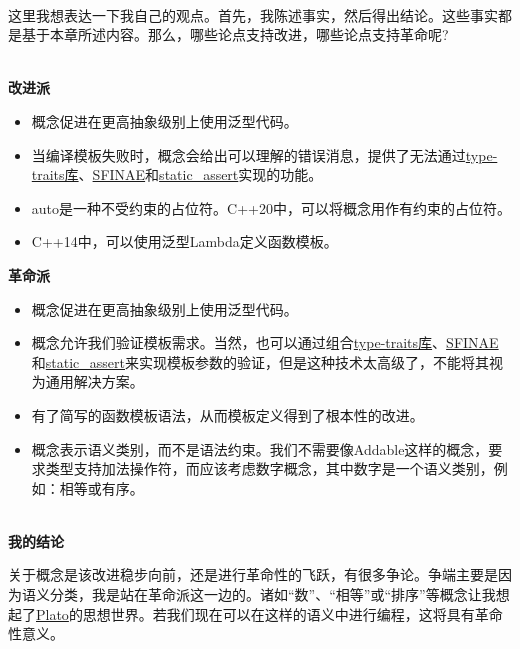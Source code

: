 \hspace*{\fill} \\ %
\begin{tcolorbox}[breakable,enhanced jigsaw,colback=blue!5!white,colframe=blue!75!black,title={常规类型}]

这里我想表达一下我自己的观点。首先，我陈述事实，然后得出结论。这些事实都是基于本章所述内容。那么，哪些论点支持改进，哪些论点支持革命呢?

\hspace*{\fill} \\ %
\noindent
\textbf{改进派}

\begin{itemize}
\item
概念促进在更高抽象级别上使用泛型代码。

\item
当编译模板失败时，概念会给出可以理解的错误消息，提供了无法通过\href{https://en.cppreference.com/w/cpp/header/type_traits}{type-traits库}、\href{https://en.cppreference.com/w/cpp/language/sfinae}{SFINAE}和\href{https://en.cppreference.com/w/cpp/language/static_assert}{static\_assert}实现的功能。

\item
auto是一种不受约束的占位符。C++20中，可以将概念用作有约束的占位符。

\item
C++14中，可以使用泛型Lambda定义函数模板。
\end{itemize}

\noindent
\textbf{革命派}

\begin{itemize}
\item
概念促进在更高抽象级别上使用泛型代码。

\item
概念允许我们验证模板需求。当然，也可以通过组合\href{https://en.cppreference.com/w/cpp/header/type_traits}{type-traits库}、\href{https://en.cppreference.com/w/cpp/language/sfinae}{SFINAE}和\href{https://en.cppreference.com/w/cpp/language/static_assert}{static\_assert}来实现模板参数的验证，但是这种技术太高级了，不能将其视为通用解决方案。

\item
有了简写的函数模板语法，从而模板定义得到了根本性的改进。

\item
概念表示语义类别，而不是语法约束。我们不需要像Addable这样的概念，要求类型支持加法操作符，而应该考虑数字概念，其中数字是一个语义类别，例如：相等或有序。
\end{itemize}

\hspace*{\fill} \\ %
\noindent
\textbf{我的结论}

关于概念是该改进稳步向前，还是进行革命性的飞跃，有很多争论。争端主要是因为语义分类，我是站在革命派这一边的。诸如“数”、“相等”或“排序”等概念让我想起了\href{https://en.wikipedia.org/wiki/Plato}{Plato}的思想世界。若我们现在可以在这样的语义中进行编程，这将具有革命性意义。
\end{tcolorbox}

